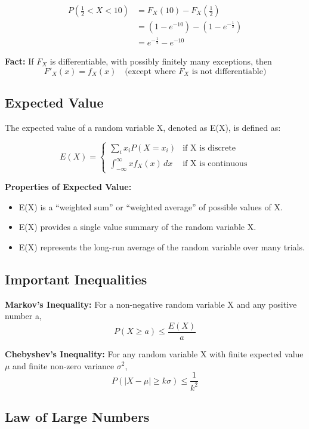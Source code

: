 \documentclass{article}
\begin{document}
    \begin{align*}
        P(\frac{1}{2} < X < 10) &= F_X(10) - F_X(\frac{1}{2}) \\
        &= (1 - e^{-10}) - (1 - e^{-\frac{1}{2}}) \\
        &= e^{-\frac{1}{2}} - e^{-10}
    \end{align*}

    \textbf{Fact:} If $F_X$ is differentiable, with possibly finitely many exceptions, then
    \[
        F'_X(x) = f_X(x) \quad \text{(except where $F_X$ is not differentiable)}
    \]

    \subsection*{Expected Value}

    The expected value of a random variable X, denoted as E(X), is defined as:

    \[
    E(X) = 
    \begin{cases} 
        \sum_{i} x_i P(X = x_i) & \text{if X is discrete} \\
        \int_{-\infty}^{\infty} x f_X(x) \, dx & \text{if X is continuous}
    \end{cases}
    \]

    \textbf{Properties of Expected Value:}
    \begin{itemize}
        \item E(X) is a ``weighted sum'' or ``weighted average'' of possible values of X.
        \item E(X) provides a single value summary of the random variable X.
        \item E(X) represents the long-run average of the random variable over many trials.
    \end{itemize}

    \subsection*{Important Inequalities}

    \textbf{Markov's Inequality:}
    For a non-negative random variable X and any positive number a,
    \[
    P(X \geq a) \leq \frac{E(X)}{a}
    \]

    \textbf{Chebyshev's Inequality:}
    For any random variable X with finite expected value $\mu$ and finite non-zero variance $\sigma^2$,
    \[
    P(|X - \mu| \geq k\sigma) \leq \frac{1}{k^2}
    \]

    \subsection*{Law of Large Numbers}
\end{document}
